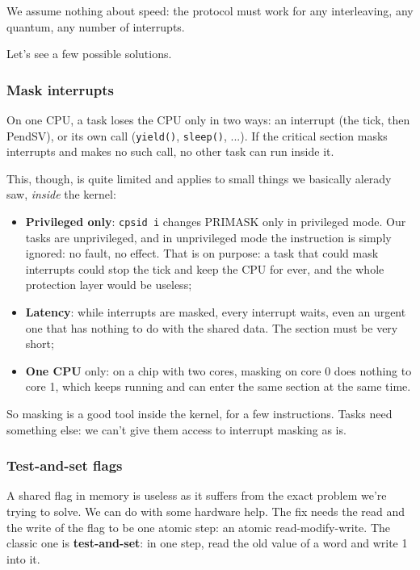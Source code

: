 \documentclass[a4paper,11pt]{article}
\begin{document}
We assume nothing about speed: the protocol must work for any interleaving, any quantum, any number of interrupts.

Let's see a few possible solutions.

\subsubsection{Mask interrupts}

On one CPU, a task loses the CPU only in two ways: an interrupt (the tick, then PendSV), or its own call (\texttt{yield()}, \texttt{sleep()}, ...). If the critical section masks interrupts and makes no such call, no other task can run inside it.

This, though, is quite limited and applies to small things we basically alerady saw, \textit{inside} the kernel:
\begin{itemize}
	\item
	      \textbf{Privileged only}: \texttt{cpsid i} changes PRIMASK only in privileged mode. Our tasks are unprivileged, and in unprivileged mode the instruction is simply ignored: no fault, no effect. That is on purpose: a task that could mask interrupts could stop the tick and keep the CPU for ever, and the whole protection layer would be useless;
	\item
	      \textbf{Latency}: while interrupts are masked, every interrupt waits, even an urgent one that has nothing to do with the shared data. The section must be very short;
	\item
	      \textbf{One CPU} only: on a chip with two cores, masking on core 0 does nothing to core 1, which keeps running and can enter the same section at the same time.
\end{itemize}

So masking is a good tool inside the kernel, for a few instructions. Tasks need something else: we can't give them access to interrupt masking as is.

\subsubsection{Test-and-set flags}

A shared flag in memory is useless as it suffers from the exact problem we're trying to solve.
We can do with some hardware help.
The fix needs the read and the write of the flag to be one atomic step: an atomic read-modify-write.
The classic one is \textbf{test-and-set}: in one step, read the old value of a word and write 1 into it.
\end{document}
